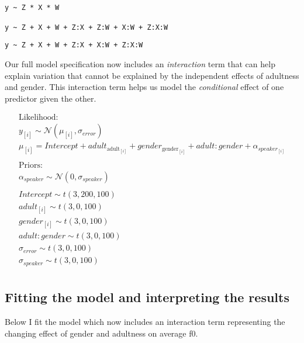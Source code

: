 \documentclass[
]{book}
\begin{document}
\texttt{y\ \textasciitilde{}\ Z\ *\ X\ *\ W}
~

\texttt{y\ \textasciitilde{}\ Z\ +\ X\ +\ W\ +\ Z:X\ +\ Z:W\ +\ X:W\ +\ Z:X:W}
~

\texttt{y\ \textasciitilde{}\ Z\ +\ X\ +\ W\ +\ Z:X\ +\ X:W\ +\ Z:X:W}

Our full model specification now includes an \emph{interaction} term that can help explain variation that cannot be explained by the independent effects of adultness and gender. This interaction term helps us model the \emph{conditional} effect of one predictor given the other.

\begin{equation}
\begin{split}
\textrm{Likelihood:} \\
y_{[i]} \sim \mathcal{N}(\mu_{[i]},\sigma_{error}) \\
\mu_{[i]} = Intercept + adult_{\textrm{adult}_{[i]}} + gender_{\textrm{gender}_{[i]}}+ adult:gender + \alpha_{speaker_{[i]}} \\\\
\textrm{Priors:} \\
\alpha_{speaker} \sim \mathcal{N}(0,\sigma_{speaker}) \\ \\ 
Intercept \sim t(3, 200, 100) \\ 
adult_{[i]} \sim t(3, 0, 100) \\ 
gender_{[i]} \sim t(3, 0, 100) \\ 
adult:gender \sim t(3, 0, 100) \\ 
\sigma_{error} \sim t(3, 0, 100) \\
\sigma_{speaker} \sim t(3, 0, 100) \\ 
\end{split}
\label{eq:43}
\end{equation}

\hypertarget{fitting-the-model-and-interpreting-the-results-1}{%
\subsection{Fitting the model and interpreting the results}\label{fitting-the-model-and-interpreting-the-results-1}}

Below I fit the model which now includes an interaction term representing the changing effect of gender and adultness on average f0.
\end{document}
